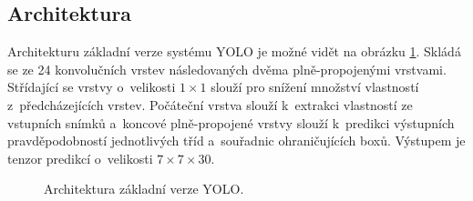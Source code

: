 

\subsection*{Architektura}
Architekturu základní verze systému YOLO je možné vidět na obrázku \ref{fig:YOLO_3}. Skládá se ze 24 konvolučních vrstev následovaných dvěma plně-propojenými vrstvami. Střídající se vrstvy o~velikosti $1 \times 1$ slouží pro snížení množství vlastností z~předcházejících vrstev. Počáteční vrstva slouží k~extrakci vlastností ze vstupních snímků a~koncové plně-propojené vrstvy slouží k~predikci výstupních pravděpodobností jednotlivých tříd a~souřadnic ohraničujících boxů. Výstupem je tenzor predikcí o~velikosti $7 \times 7 \times 30$.

\begin{figure}[H]
    \centering
    \caption{Architektura základní verze YOLO.\footnotemark}
    \label{fig:YOLO_3}
\end{figure}


